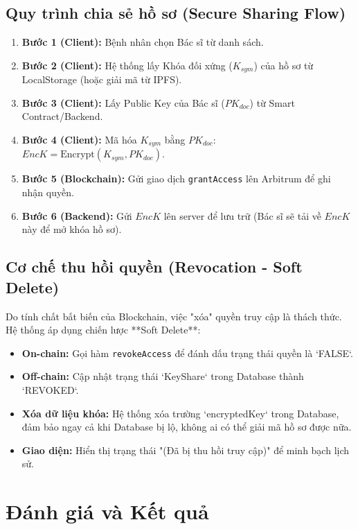 \documentclass[12pt,a4paper]{report}
\begin{document}
\section{Quy trình chia sẻ hồ sơ (Secure Sharing Flow)}
\begin{enumerate}
    \item \textbf{Bước 1 (Client):} Bệnh nhân chọn Bác sĩ từ danh sách.
    \item \textbf{Bước 2 (Client):} Hệ thống lấy Khóa đối xứng ($K_{sym}$) của hồ sơ từ LocalStorage (hoặc giải mã từ IPFS).
    \item \textbf{Bước 3 (Client):} Lấy Public Key của Bác sĩ ($PK_{doc}$) từ Smart Contract/Backend.
    \item \textbf{Bước 4 (Client):} Mã hóa $K_{sym}$ bằng $PK_{doc}$: $EncK = \text{Encrypt}(K_{sym}, PK_{doc})$.
    \item \textbf{Bước 5 (Blockchain):} Gửi giao dịch \texttt{grantAccess} lên Arbitrum để ghi nhận quyền.
    \item \textbf{Bước 6 (Backend):} Gửi $EncK$ lên server để lưu trữ (Bác sĩ sẽ tải về $EncK$ này để mở khóa hồ sơ).
\end{enumerate}

\section{Cơ chế thu hồi quyền (Revocation - Soft Delete)}
Do tính chất bất biến của Blockchain, việc "xóa" quyền truy cập là thách thức. Hệ thống áp dụng chiến lược **Soft Delete**:
\begin{itemize}
    \item \textbf{On-chain:} Gọi hàm \texttt{revokeAccess} để đánh dấu trạng thái quyền là `FALSE`.
    \item \textbf{Off-chain:} Cập nhật trạng thái `KeyShare` trong Database thành `REVOKED`.
    \item \textbf{Xóa dữ liệu khóa:} Hệ thống xóa trường `encryptedKey` trong Database, đảm bảo ngay cả khi Database bị lộ, không ai có thể giải mã hồ sơ được nữa.
    \item \textbf{Giao diện:} Hiển thị trạng thái "(Đã bị thu hồi truy cập)" để minh bạch lịch sử.
\end{itemize}

\chapter{Đánh giá và Kết quả}\label{chuong-5}
\end{document}
